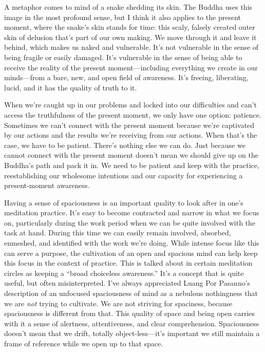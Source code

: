 A metaphor comes to mind of a snake shedding its skin. The Buddha uses 
this image in the most profound sense, but I think it also applies to 
the present moment, where the snake's skin stands for time: this scaly, 
falsely created outer skin of delusion that's part of our own making. 
We move through it and leave it behind, which makes us naked and 
vulnerable. It's not vulnerable in the sense of being fragile or easily 
damaged. It's vulnerable in the sense of being able to receive the 
reality of the present moment---including everything we create in our 
minds---from a bare, new, and open field of awareness. It's freeing, 
liberating, lucid, and it has the quality of truth to it.

When we're caught up in our problems and locked into our difficulties 
and can't access the truthfulness of the present moment, we only have 
one option: patience. Sometimes we can't connect with the present 
moment because we're captivated by our actions and the results we're 
receiving from our actions. When that's the case, we have to be 
patient. There's nothing else we can do. Just because we cannot connect 
with the present moment doesn't mean we should give up on the Buddha's 
path and pack it in. We need to be patient and keep with the practice, 
reestablishing our wholesome intentions and our capacity for 
experiencing a present-moment awareness.


Having a sense of spaciousness is an important quality to look after in 
one's meditation practice. It's easy to become contracted and narrow in 
what we focus on, particularly during the work period when we can be 
quite involved with the task at hand. During this time we can easily 
remain involved, absorbed, enmeshed, and identified with the work we're 
doing. While intense focus like this can serve a purpose, the 
cultivation of an open and spacious mind can help keep this focus in 
the context of practice. This is talked about in certain meditation 
circles as keeping a ``broad choiceless awareness.'' It's a concept 
that is quite useful, but often misinterpreted. I've always appreciated 
Luang Por Pasanno's description of an unfocused spaciousness of mind as 
a nebulous nothingness that we are \emph{not} trying to cultivate. We 
are not striving for spaciness, because spaciousness is different from 
that. This quality of space and being open carries with it a sense of 
alertness, attentiveness, and clear comprehension. Spaciousness doesn't 
mean that we drift, totally object-less---it's important we still 
maintain a frame of reference while we open up to that space.

